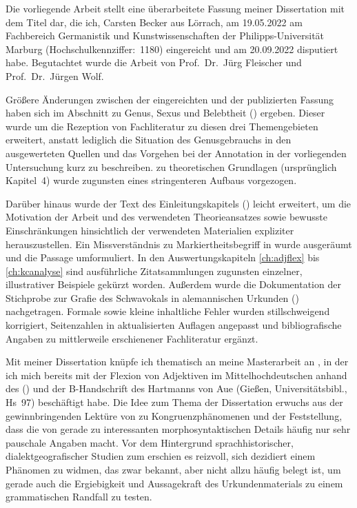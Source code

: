 \addchap{\lsPrefaceTitle}

Die vorliegende Arbeit stellt eine überarbeitete Fassung meiner Dissertation
mit dem Titel  dar, die ich, Carsten Becker aus Lörrach, am
19.05.2022 am Fachbereich Germanistik und Kunstwissenschaften der
Philipps-Universität Marburg (Hochschulkennziffer:~1180) eingereicht und am
20.09.2022 disputiert habe. Begutachtet wur\-de die Arbeit von Prof.~Dr.~Jürg
Fleischer und Prof.~Dr.~Jürgen Wolf.

Größere Änderungen zwischen der eingereichten und der publizierten Fassung
haben sich im Abschnitt zu Genus, Sexus und Belebtheit ()
ergeben. Dieser wurde um die Rezeption von Fachliteratur zu diesen drei
Themengebieten erweitert, anstatt lediglich die Situation des Genusgebrauchs in
den ausgewerteten Quellen und das Vorgehen bei der Annotation in der
vorliegenden Untersuchung kurz zu beschreiben.  zu
theoretischen Grundlagen (ursprünglich Kapitel~4) wurde zugunsten eines
stringenteren Aufbaus vorgezogen.

Darüber hinaus wurde der Text des Einleitungskapitels ()
leicht erweitert, um die Motivation der Arbeit und des verwendeten
Theorieansatzes sowie bewusste Einschränkungen hinsichtlich der verwendeten
Materialien expliziter herauszustellen. Ein Missverständnis zu
 Markiertheitsbegriff in 
wurde ausgeräumt und die Passage umformuliert. In den Aus\-wertungs\-kapi\-teln
\ref{ch:adjflex} bis \ref{ch:kcanalyse} sind ausführliche Zitatsammlungen
zugunsten einzelner, illustrativer Beispiele gekürzt worden. Außerdem wurde die
Dokumentation der Stich\-probe zur Grafie des Schwa\-vokals in alemannischen
Urkunden () nachgetragen. Formale sowie kleine
inhaltliche Fehler wurden stillschweigend korrigiert, Sei\-ten\-zahlen in
aktualisierten Auflagen angepasst und bibliografische Angaben zu mittlerweile
erschienener Fachliteratur ergänzt.

Mit meiner Dissertation knüpfe ich thematisch an meine Masterarbeit an
\autocite{becker2016}, in der ich mich bereits mit der Flexion von Adjektiven
im Mittelhochdeutschen anhand des  (\CAO) und der B-Handschrift des  Hartmanns von
Aue (Gießen, Universitätsbibl., Hs~97) beschäftigt habe. Die Idee zum Thema der
Dissertation erwuchs aus der gewinnbringenden Lektüre von \citet{corbett2006}
zu Kongruenz\-phänomenen und der Feststellung, dass die  von \citet{paul2007} gerade zu interessanten morpho\-syntaktischen
Details häufig nur sehr pauschale Angaben macht. Vor dem Hintergrund
sprach\-historischer, dialekt\-geografischer Studien zum \CAO{}
\autocite{beckerschallert2021,beckerschallert2022a, beckerschallert2022b}
erschien es reizvoll, sich dezidiert einem Phänomen zu widmen, das zwar bekannt,
aber nicht allzu häufig belegt ist, um gerade auch die Ergiebigkeit und
Aussagekraft des Urkunden\-materials zu einem grammatischen Randfall zu testen.

